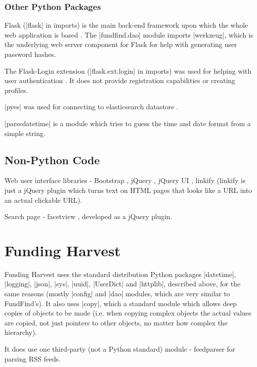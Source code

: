 \subsubsection{Other Python Packages}

Flask (|flask| in imports) is the main back-end framework upon which the whole web application is based \cite{flask}. The |fundfind.dao| module imports |werkzeug|, which is the underlying web server component for Flask for help with generating user password hashes.

The Flask-Login extension (|flask.ext.login| in imports) was used for helping with user authentication \cite{flask-login}. It does not provide registration capabilities or creating profiles.

|pyes| was used for connecting to elasticsearch datastore \cite{pyes}.

|parsedatetime| \cite{parsedatetime} is a module which tries to guess the time and date format from a simple string.

\subsection{Non-Python Code}
Web user interface libraries - Bootstrap \cite{bootstrap}, jQuery \cite{jquery}, jQuery UI \cite{jquery-ui}, linkify \cite{linkify} (linkify is just a jQuery plugin which turns text on HTML pages that looks like a URL into an actual clickable URL).

Search page - facetview \cite{facetview}, developed as a jQuery plugin.


\section{Funding Harvest}
Funding Harvest uses the standard distribution Python packages |datetime|, |logging|, |json|, |sys|, |uuid|, |UserDict| and |httplib|, described above, for the same reasons (mostly |config| and |dao| modules, which are very similar to FundFind's). It also uses |copy|, which a standard module which allows deep copies of objects to be made (i.e. when copying complex objects the actual values are copied, not just pointers to other objects, no matter how complex the hierarchy).

It does use one third-party (not a Python standard) module - feedparser \cite{feedparser} for parsing RSS feeds.
